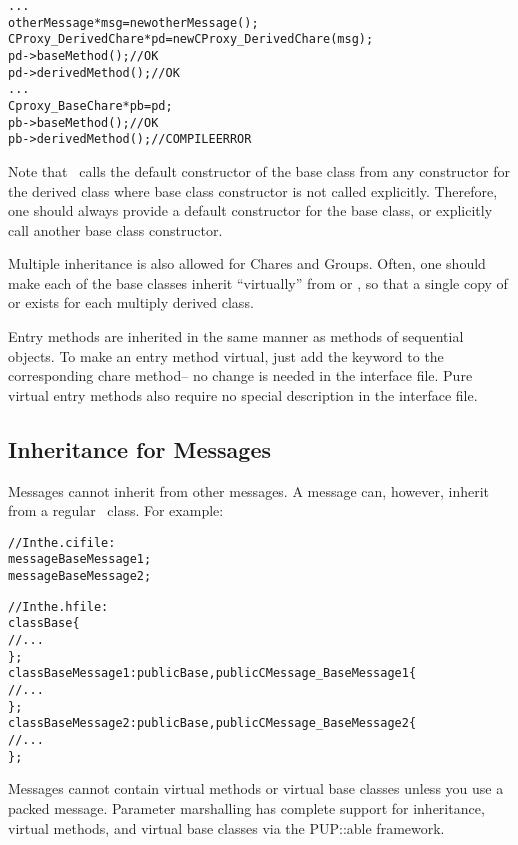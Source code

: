 \begin{alltt}
  ...
  otherMessage *msg = new otherMessage();
  CProxy_DerivedChare *pd = new CProxy_DerivedChare(msg);
  pd->baseMethod();     // OK
  pd->derivedMethod();  // OK
  ...
  Cproxy_BaseChare *pb = pd;
  pb->baseMethod();    // OK
  pb->derivedMethod(); // COMPILE ERROR
\end{alltt}

Note that \CC\ calls the default constructor  of the
base class from any constructor for the derived class where base class
constructor is not called explicitly. Therefore, one should always provide a
default constructor for the base class, or explicitly call another base
class constructor.

Multiple inheritance  is also allowed for Chares
and Groups. Often, one should make each of the base classes inherit
``virtually'' from  or , so that a single copy of
 or  exists for each multiply derived class.

Entry methods are inherited in the
same manner as methods of sequential \CC{} objects.  
To make an entry method virtual, just add the keyword 
to the corresponding chare method-- no change is needed in the interface file.
Pure virtual entry methods also require no special description
in the interface file.


\subsection{Inheritance for Messages}


Messages cannot inherit from other messages.  A message can, however,
inherit from a regular \CC\ class.  For example:

\begin{alltt}
//In the .ci file:
  message BaseMessage1;
  message BaseMessage2;

//In the .h file:
  class Base \{
    // ...
  \};
  class BaseMessage1 : public Base, public CMessage_BaseMessage1 \{
    // ...
  \};
  class BaseMessage2 : public Base, public CMessage_BaseMessage2 \{
    // ...
  \};
\end{alltt}

Messages cannot contain virtual methods
or virtual base classes unless you use a packed message.
Parameter marshalling has complete support for inheritance, virtual
methods, and virtual base classes via the PUP::able framework.


